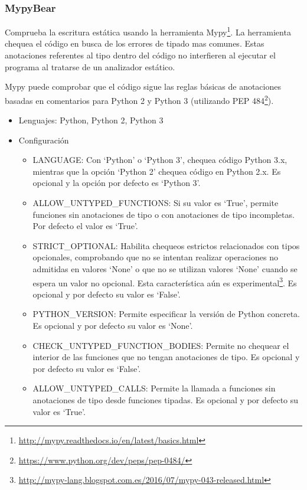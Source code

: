 \documentclass[a4paper, 12pt]{book}
\begin{document}
\subsubsection{MypyBear}
\label{sec:seccion1.2.4}
Comprueba la escritura estática usando la herramienta Mypy\footnote{\url{http://mypy.readthedocs.io/en/latest/basics.html}}. La herramienta chequea el código en busca de los errores de tipado mas comunes. Estas anotaciones referentes al tipo dentro del código no interfieren al ejecutar el programa al tratarse de un analizador estático.

Mypy puede comprobar que el código sigue las reglas básicas de anotaciones basadas en comentarios para Python 2 y Python 3 (utilizando PEP 484\footnote{\url{https://www.python.org/dev/peps/pep-0484/}}).

\begin{itemize}
  \item Lenguajes: Python, Python 2, Python 3
  \item Configuración
    \begin{itemize}
          \item LANGUAGE: Con `Python' o `Python 3', chequea código Python 3.x, mientras que la opción `Python 2' chequea código en Python 2.x. Es opcional y la opción por defecto es `Python 3'.
          \item ALLOW\_UNTYPED\_FUNCTIONS: Si su valor es `True', permite funciones sin anotaciones de tipo o con anotaciones de tipo incompletas. Por defecto el valor es `True'.
          \item STRICT\_OPTIONAL: Habilita chequeos estrictos relacionados con tipos opcionales, comprobando que no se intentan realizar operaciones no admitidas en valores `None' o que no se utilizan valores `None' cuando se espera un valor no opcional. Esta característica aún es experimental\footnote{\url{http://mypy-lang.blogspot.com.es/2016/07/mypy-043-released.html}}. Es opcional y por defecto su valor es `False'.
          \item PYTHON\_VERSION: Permite especificar la versión de Python concreta. Es opcional y por defecto su valor es `None'.
          \item CHECK\_UNTYPED\_FUNCTION\_BODIES: Permite no chequear el interior de las funciones que no tengan anotaciones de tipo. Es opcional y por defecto su valor es `False'.
          \item ALLOW\_UNTYPED\_CALLS: Permite la llamada a funciones sin anotaciones de tipo desde funciones tipadas. Es opcional y por defecto su valor es `True'.
    \end{itemize}
\end{itemize}
\end{document}
